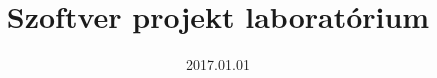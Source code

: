 \documentclass{book}
\begin{document}
\title{Szoftver projekt laboratórium}
\date{2017.01.01}
\author{}



\end{document}
